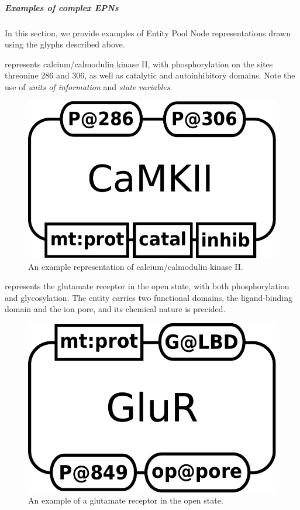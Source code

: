 
\subparagraph{Examples of complex EPNs}
\label{sec:CplxEPNs}

In this section, we provide examples of Entity Pool Node representations drawn using the \SBGNPDLone glyphs described above. 

 represents calcium/calmodulin kinase II, with phosphorylation on the sites threonine 286 and 306, as well as catalytic and autoinhibitory domains.  Note the use of \emph{units of information} and \emph{state variables}.

\begin{figure}[H]
  \centering
  \includegraphics[scale = 0.3]{examples/macromolecule-CaMKII}
  \caption{An example representation of calcium/calmodulin kinase II.}
  \label{fig:example-camkii}
\end{figure}

 represents the glutamate receptor in the open state, with both phosphorylation and glycosylation.  The entity carries two functional domains, the ligand-binding domain and the ion pore, and its chemical nature is precided.

\begin{figure}[H]
  \centering
  \includegraphics[scale = 0.3]{examples/macromolecule-GluR}
  \caption{An example of a glutamate receptor in the open state.}
  \label{fig:example-glur}
\end{figure}




